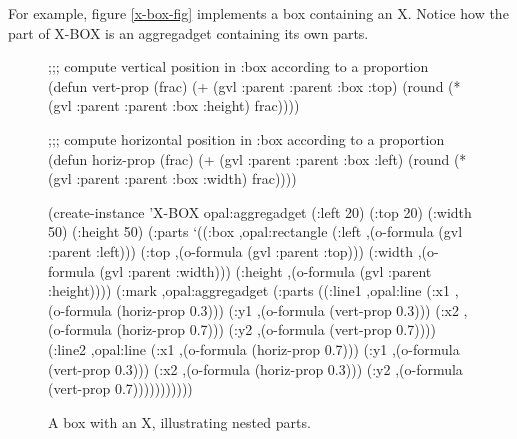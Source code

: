 For example, figure \ref{x-box-fig} implements a box containing an X.
Notice how the  part of X-BOX is an aggregadget containing
its own parts.
\begin{figure}
\begin{center}
\end{center}
\begin{programexample}

;;; compute vertical position in :box according to a proportion
(defun vert-prop (frac)
  (+ (gvl :parent :parent :box :top)
     (round (* (gvl :parent :parent :box :height)
	       frac))))

;;; compute horizontal position in :box according to a proportion
(defun horiz-prop (frac)
  (+ (gvl :parent :parent :box :left)
     (round (* (gvl :parent :parent :box :width)
	       frac))))

(create-instance 'X-BOX opal:aggregadget
   (:left 20)
   (:top 20)
   (:width 50)
   (:height 50)
   (:parts
    `((:box ,opal:rectangle
	    (:left ,(o-formula (gvl :parent :left)))
	    (:top  ,(o-formula (gvl :parent :top)))
	    (:width  ,(o-formula (gvl :parent :width)))
	    (:height ,(o-formula (gvl :parent :height))))
      (:mark ,opal:aggregadget
	     (:parts
	      ((:line1 ,opal:line
		       (:x1 ,(o-formula (horiz-prop 0.3)))
		       (:y1 ,(o-formula (vert-prop 0.3)))
		       (:x2 ,(o-formula (horiz-prop 0.7)))
		       (:y2 ,(o-formula (vert-prop 0.7))))
	       (:line2 ,opal:line
		       (:x1 ,(o-formula (horiz-prop 0.7)))
		       (:y1 ,(o-formula (vert-prop 0.3)))
		       (:x2 ,(o-formula (horiz-prop 0.3)))
		       (:y2 ,(o-formula (vert-prop 0.7)))))))))))

\end{programexample}
\caption{A box with an X, illustrating nested parts.}
\end{figure}


